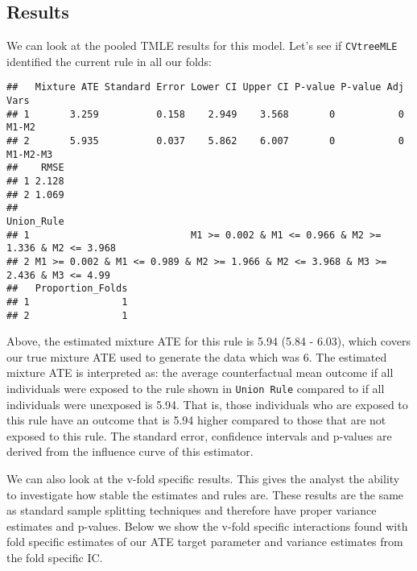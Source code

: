 \documentclass[
]{article}
\newenvironment{Shaded}{\begin{snugshade}}{\end{snugshade}}
\newcommand{\AttributeTok}[1]{\textcolor[rgb]{0.77,0.63,0.00}{#1}}
\newcommand{\FloatTok}[1]{\textcolor[rgb]{0.00,0.00,0.81}{#1}}
\newcommand{\FunctionTok}[1]{\textcolor[rgb]{0.00,0.00,0.00}{#1}}
\newcommand{\NormalTok}[1]{#1}
\newcommand{\OtherTok}[1]{\textcolor[rgb]{0.56,0.35,0.01}{#1}}
\newcommand{\SpecialCharTok}[1]{\textcolor[rgb]{0.00,0.00,0.00}{#1}}
\newcommand{\StringTok}[1]{\textcolor[rgb]{0.31,0.60,0.02}{#1}}
\begin{document}
\hypertarget{results}{%
\subsection{Results}\label{results}}

We can look at the pooled TMLE results for this model. Let's see if
\texttt{CVtreeMLE} identified the current rule in all our folds:

\begin{Shaded}
\end{Shaded}

\begin{verbatim}
##   Mixture ATE Standard Error Lower CI Upper CI P-value P-value Adj     Vars
## 1       3.259          0.158    2.949    3.568       0           0    M1-M2
## 2       5.935          0.037    5.862    6.007       0           0 M1-M2-M3
##    RMSE
## 1 2.128
## 2 1.069
##                                                                         Union_Rule
## 1                            M1 >= 0.002 & M1 <= 0.966 & M2 >= 1.336 & M2 <= 3.968
## 2 M1 >= 0.002 & M1 <= 0.989 & M2 >= 1.966 & M2 <= 3.968 & M3 >= 2.436 & M3 <= 4.99
##   Proportion_Folds
## 1                1
## 2                1
\end{verbatim}

Above, the estimated mixture ATE for this rule is 5.94 (5.84 - 6.03),
which covers our true mixture ATE used to generate the data which was 6.
The estimated mixture ATE is interpreted as: the average counterfactual
mean outcome if all individuals were exposed to the rule shown in
\texttt{Union\ Rule} compared to if all individuals were unexposed is
5.94. That is, those individuals who are exposed to this rule have an
outcome that is 5.94 higher compared to those that are not exposed to
this rule. The standard error, confidence intervals and p-values are
derived from the influence curve of this estimator.

We can also look at the v-fold specific results. This gives the analyst
the ability to investigate how stable the estimates and rules are. These
results are the same as standard sample splitting techniques and
therefore have proper variance estimates and p-values. Below we show the
v-fold specific interactions found with fold specific estimates of our
ATE target parameter and variance estimates from the fold specific IC.
\end{document}
